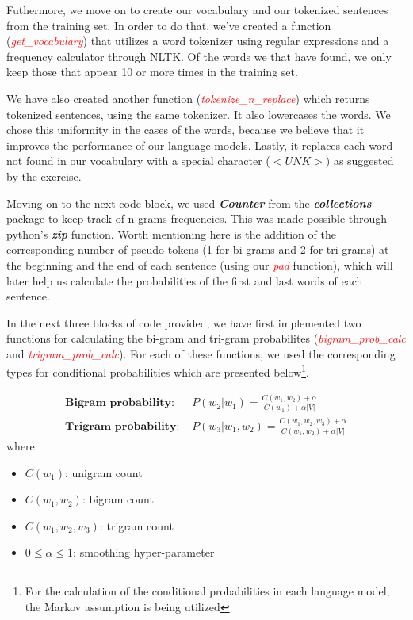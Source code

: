 \documentclass[11pt]{article}
\begin{document}
Futhermore, we move on to create our vocabulary and our tokenized sentences from the training set. In order to do that, we've created a function (\textcolor{red}{\textit{get\_vocabulary}}) that utilizes a word tokenizer using regular expressions and a frequency calculator through NLTK. Of the words we that have found, we only keep those that appear 10 or more times in the training set. 

We have also created another function (\textcolor{red}{\textit{tokenize\_n\_replace}}) which returns tokenized sentences, using the same tokenizer. It also lowercases the words. We chose this uniformity in the cases of the words, because  we believe that it improves the performance of our language models. Lastly, it replaces each word not found in our vocabulary with a special character (\textbf{$<UNK>$}) as suggested by the exercise.

Moving on to the next code block, we used \textbf{\textit{Counter}} from the \textbf{\textit{collections}} package to keep track of n-grams frequencies. This was made possible through python's \textbf{\textit{zip}} function. Worth mentioning here is the addition of the corresponding number of pseudo-tokens (1 for bi-grams and 2 for tri-grams) at the beginning and the end of each sentence (using our \textcolor{red}{\textit{pad}} function), which will later help us calculate the probabilities of the first and last words of each sentence.

In the next three blocks of code provided, we have first implemented two functions for calculating the bi-gram and tri-gram probabilites (\textcolor{red}{\textit{bigram\_prob\_calc}} and \textcolor{red}{\textit{trigram\_prob\_calc}}). For each of these functions, we used the corresponding types for conditional probabilities which are presented below\footnote{For the calculation of the conditional probabilities in each language model, the Markov assumption is being utilized}. 

\begin{align*}
\textbf{Bigram probability: }& P(w_2|w_1) = \frac{C(w_1,w_2)+\alpha}{C(w_1)+\alpha|V|} \\
\textbf{Trigram probability: }& P(w_3|w_1,w_2) = \frac{C(w_1,w_2,w_3)+\alpha}{C(w_1,w_2)+\alpha|V|}
\end{align*}
where 
\begin{itemize}
\item $C(w_1)$: unigram count
\item $C(w_1,w_2)$: bigram count
\item $C(w_1,w_2,w_3)$: trigram count
\item $0 \leq \alpha \leq 1$: smoothing hyper-parameter
\end{itemize}
\end{document}
